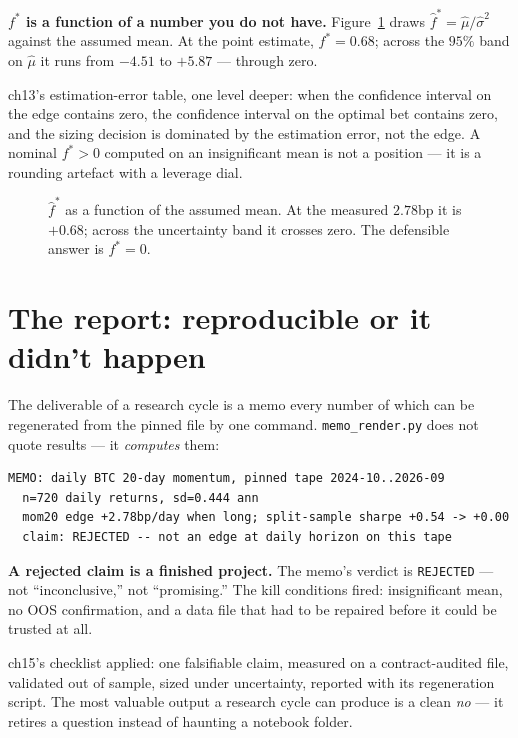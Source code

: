 \begin{example}\label{ex:kelly17}
\textbf{$f^*$ is a function of a number you do not have.}
Figure~\ref{fig:kelly17} draws $\hat f^*=\hat\mu/\hat\sigma^2$
against the assumed mean. At the point estimate, $f^*=0.68$;
across the $95\%$ band on $\hat\mu$ it runs from $-4.51$ to
$+5.87$ --- through zero.
\begin{solution}
ch13's estimation-error table, one level deeper: when the
confidence interval on the edge contains zero, the confidence
interval on the optimal bet contains zero, and the sizing
decision is dominated by the estimation error, not the edge.
A nominal $f^*>0$ computed on an insignificant mean is not a
position --- it is a rounding artefact with a leverage dial.
\end{solution}
\end{example}

\begin{figure}[htbp]\centering

\caption{$\hat f^*$ as a function of the assumed mean. At the
measured $2.78$bp it is $+0.68$; across the uncertainty band it
crosses zero. The defensible answer is $f^*=0$.}
\label{fig:kelly17}
\end{figure}

\section{The report: reproducible or it didn't happen}\label{sec:report}

The deliverable of a research cycle is a memo every number of
which can be regenerated from the pinned file by one command.
\texttt{memo\_render.py} does not quote results --- it
\emph{computes} them:
\begin{verbatim}
MEMO: daily BTC 20-day momentum, pinned tape 2024-10..2026-09
  n=720 daily returns, sd=0.444 ann
  mom20 edge +2.78bp/day when long; split-sample sharpe +0.54 -> +0.00
  claim: REJECTED -- not an edge at daily horizon on this tape
\end{verbatim}

\begin{example}\label{ex:memo17}
\textbf{A rejected claim is a finished project.} The memo's
verdict is \texttt{REJECTED} --- not ``inconclusive,'' not
``promising.'' The kill conditions fired: insignificant mean,
no OOS confirmation, and a data file that had to be repaired
before it could be trusted at all.
\begin{solution}
ch15's checklist applied: one falsifiable claim, measured on a
contract-audited file, validated out of sample, sized under
uncertainty, reported with its regeneration script. The most
valuable output a research cycle can produce is a clean
\emph{no} --- it retires a question instead of haunting a
notebook folder.
\end{solution}
\end{example}

